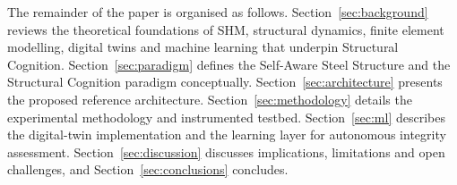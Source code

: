 The remainder of the paper is organised as follows. Section~\ref{sec:background} reviews the theoretical foundations of SHM, structural dynamics, finite element modelling, digital twins and machine learning that underpin Structural Cognition. Section~\ref{sec:paradigm} defines the Self-Aware Steel Structure and the Structural Cognition paradigm conceptually. Section~\ref{sec:architecture} presents the proposed reference architecture. Section~\ref{sec:methodology} details the experimental methodology and instrumented testbed. Section~\ref{sec:ml} describes the digital-twin implementation and the learning layer for autonomous integrity assessment. Section~\ref{sec:discussion} discusses implications, limitations and open challenges, and Section~\ref{sec:conclusions} concludes.

